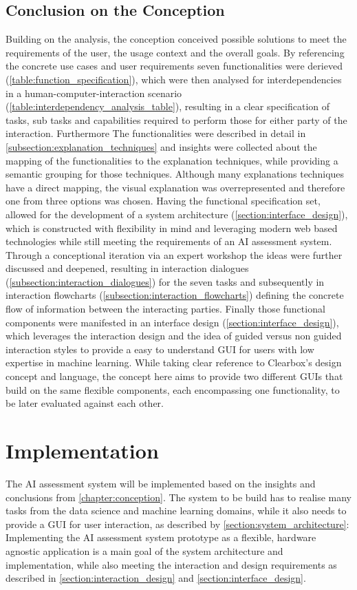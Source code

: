 \documentclass[11pt,a4paper,english]{scrreprt}
\begin{document}
\section{Conclusion on the Conception}
Building on the analysis, the conception conceived possible solutions to meet the requirements of the user, the usage context and the overall goals. By referencing the concrete use cases and user requirements seven functionalities were derieved (\autoref{table:function_specification}), which were then analysed for interdependencies in a human-computer-interaction scenario (\autoref{table:interdependency_analysis_table}), resulting in a clear specification of tasks, sub tasks and capabilities required to perform those for either party of the interaction. Furthermore The functionalities were described in detail in \autoref{subsection:explanation_techniques} and insights were collected about the mapping of the functionalities to the explanation techniques, while providing a semantic grouping for those techniques. Although many explanations techniques have a direct mapping, the visual explanation was overrepresented and therefore one from three options was chosen. Having the functional specification set, allowed for the development of a system architecture (\autoref{section:interface_design}), which is constructed with flexibility in mind and leveraging modern web based technologies while still meeting the requirements of an AI assessment system. Through a conceptional iteration via an expert workshop the ideas were further discussed and deepened, resulting in interaction dialogues (\autoref{subsection:interaction_dialogues}) for the seven tasks and subsequently in interaction flowcharts (\autoref{subsection:interaction_flowcharts}) defining the concrete flow of information between the interacting parties. Finally those functional components were manifested in an interface design (\autoref{section:interface_design}), which leverages the interaction design and the idea of guided versus non guided interaction styles to provide a easy to understand GUI for users with low expertise in machine learning. While taking clear reference to Clearbox's design concept and language, the concept here aims to provide two different GUIs that build on the same flexible components, each encompassing one functionality, to be later evaluated against each other.

\newpage
\chapter{Implementation}\label{chapter:implementation}
The AI assessment system will be implemented based on the insights and conclusions from \autoref{chapter:conception}. The system to be build has to realise many tasks from the data science and machine learning domains, while it also needs to provide a GUI for user interaction, as described by \autoref{section:system_architecture}: Implementing the AI assessment system prototype as a flexible, hardware agnostic application is a main goal of the system architecture and implementation, while also meeting the interaction and design requirements as described in \autoref{section:interaction_design} and \autoref{section:interface_design}.
\end{document}

